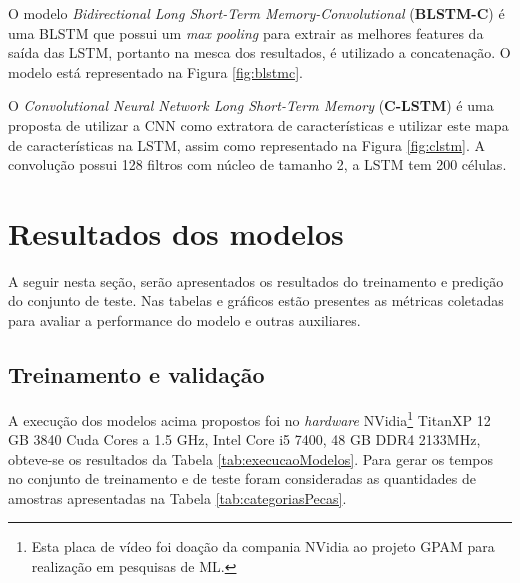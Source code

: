 O modelo \textit{Bidirectional Long Short-Term Memory-Convolutional} (\textbf{BLSTM-C}) \cite{lai_recurrent_2015} é uma BLSTM que possui um
\textit{max pooling} para extrair as melhores features da saída das LSTM,
portanto na mesca dos resultados, é utilizado a concatenação. O modelo está
representado na Figura \ref{fig:blstmc}.

O \textit{Convolutional Neural Network Long Short-Term Memory} (\textbf{C-LSTM}) \cite{zhou_c-lstm_2015} é uma proposta de utilizar a CNN como extratora
de características e utilizar este mapa de características na LSTM, assim como
representado na Figura \ref{fig:clstm}. A convolução possui 128 filtros com
núcleo de tamanho 2, a LSTM tem 200 células.


\section{Resultados dos modelos}

A seguir nesta seção, serão apresentados os resultados do treinamento e predição do conjunto de teste. Nas tabelas e gráficos estão presentes as métricas coletadas para avaliar a performance do modelo e outras auxiliares.

\subsection{Treinamento e validação}

A execução dos modelos acima propostos foi no \textit{hardware} NVidia\footnote{Esta placa de vídeo foi doação da compania NVidia ao projeto GPAM para realização em pesquisas de ML.} TitanXP 12 GB 3840 Cuda Cores a 1.5 GHz, Intel Core i5 7400, 48 GB DDR4 2133MHz, obteve-se os resultados da Tabela \ref{tab:execucaoModelos}. Para gerar os tempos no conjunto de treinamento e de teste foram consideradas as quantidades de amostras apresentadas na Tabela \ref{tab:categoriasPecas}.

